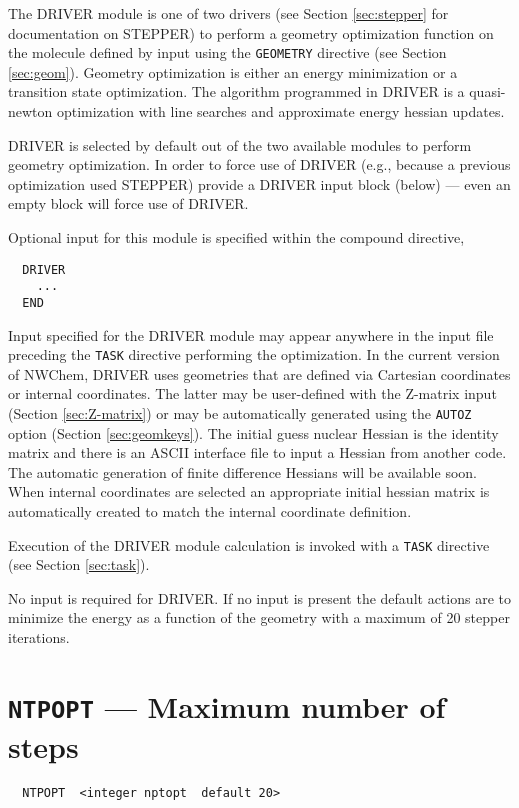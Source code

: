 \label{sec:driver}

The DRIVER module is one of two drivers (see Section \ref{sec:stepper}
for documentation on STEPPER) to perform a geometry optimization
function on the molecule defined by input using the \verb+GEOMETRY+
directive (see Section \ref{sec:geom}).  Geometry optimization is
either an energy minimization or a transition state optimization.
The algorithm programmed in DRIVER is a quasi-newton optimization
with line searches and approximate energy hessian updates.

DRIVER is selected by default out of the two available modules to
perform geometry optimization.  In order to force use of DRIVER (e.g.,
because a previous optimization used STEPPER) provide a DRIVER input
block (below) --- even an empty block will force use of DRIVER.

Optional input for this module is specified within the compound
directive,
\begin{verbatim}
  DRIVER 
    ...
  END
\end{verbatim}

Input specified for the DRIVER module may appear anywhere in the input
file preceding the \verb+TASK+ directive performing the optimization.
In the current version of NWChem, DRIVER uses geometries that are
defined via Cartesian coordinates or internal coordinates. The latter
may be user-defined with the Z-matrix input (Section
\ref{sec:Z-matrix}) or may be automatically generated using the
\verb+AUTOZ+ option (Section \ref{sec:geomkeys}).  The initial guess
nuclear Hessian is the identity matrix and there is an ASCII interface
file to input a Hessian from another code.  The automatic generation
of finite difference Hessians will be available soon. When internal
coordinates are selected an appropriate initial hessian matrix is
automatically created to match the internal coordinate definition.

Execution of the DRIVER module calculation is invoked with a
\verb+TASK+ directive (see Section \ref{sec:task}).

No input is required for DRIVER.  If no input is present the default
actions are to minimize the energy as a function of the geometry with a
maximum of 20 stepper iterations.

\section{{\tt NTPOPT} --- Maximum number of steps}

\begin{verbatim}
  NTPOPT  <integer nptopt  default 20>
\end{verbatim}

